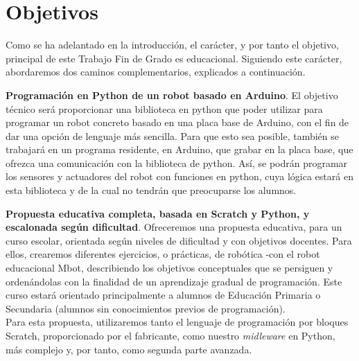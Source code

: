 \chapter{Objetivos}
\label{cap:objetivos}

Como se ha adelantado en la introducción, el carácter, y por tanto el objetivo, principal de este Trabajo Fin de Grado es educacional. Siguiendo este carácter, abordaremos dos caminos complementarios, explicados a continuación. 
\\
	\par \textbf{Programación en Python de un robot basado en Arduino}. El objetivo técnico será proporcionar una biblioteca en python que poder utilizar para programar un robot concreto basado en una placa base de Arduino, con el fin de dar una opción de lenguaje más sencilla. Para que esto sea posible, también se trabajará en un programa residente, en Arduino, que grabar en la placa base, que ofrezca una comunicación con la biblioteca de python. Así, se podrán programar los sensores y actuadores del robot con funciones en python, cuya lógica estará en esta biblioteca y de la cual no tendrán que preocuparse los alumnos. 
	\\
	\par \textbf{Propuesta educativa completa, basada en Scratch y Python, y escalonada según dificultad}.
	Ofreceremos una propuesta educativa, para un curso escolar, orientada según niveles de dificultad y con objetivos docentes. Para ellos, crearemos diferentes ejercicios, o prácticas, de robótica -con el robot educacional Mbot, describiendo los objetivos conceptuales que se persiguen y ordenándolas con la finalidad de un aprendizaje gradual de programación. Este curso estará orientado principalmente a alumnos de Educación Primaria o Secundaria (alumnos sin conocimientos previos de programación). \\
	Para esta propuesta, utilizaremos tanto el lenguaje de programación por bloques Scratch, proporcionado por el fabricante, como nuestro \textit{midleware} en Python, más complejo y, por tanto, como segunda parte avanzada.
